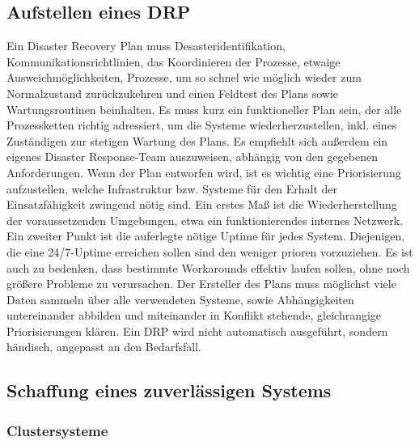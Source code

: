 \documentclass[letterpaper, 12pt]{article}
\let\tempsubsection\subsection
\renewcommand\subsection[1]{\vspace{0cm}\tempsubsection{#1}\vspace{0cm}}
\let\tempsubsubsection\subsubsection
\renewcommand\subsubsection[1]{\vspace{0cm}\tempsubsubsection{#1}\vspace{0cm}}
\begin{document}
\subsection{Aufstellen eines DRP \cite{booktwo}}

Ein Disaster Recovery Plan muss Desasteridentifikation, Kommunikationsrichtlinien, 
das Koordinieren der Prozesse, etwaige Ausweichmöglichkeiten, Prozesse, um so schnel wie möglich wieder 
zum Normalzustand zurückzukehren und einen Feldtest des Plans sowie Wartungsroutinen beinhalten. 
Es muss kurz ein funktioneller Plan sein, der alle Prozessketten richtig adressiert, um die 
Systeme wiederherzustellen, inkl. eines Zuständigen zur stetigen Wartung des Plans.
Es empfiehlt sich außerdem ein eigenes Disaster Response-Team auszuweisen, abhängig von den
gegebenen Anforderungen. Wenn der Plan entworfen wird, ist es wichtig eine Priorisierung aufzustellen,
welche Infrastruktur bzw. Systeme für den Erhalt der Einsatzfähigkeit zwingend nötig sind. Ein erstes Maß
ist die Wiederherstellung der voraussetzenden Umgebungen, etwa ein funktionierendes internes Netzwerk. Ein 
zweiter Punkt ist die auferlegte nötige Uptime für jedes System. Diejenigen, die eine 24/7-Uptime erreichen sollen
sind den weniger prioren vorzuziehen.
Es ist auch zu bedenken, dass bestimmte Workarounds effektiv laufen sollen, ohne noch größere Probleme
zu verursachen. Der Ersteller des Plans muss möglichst viele Daten sammeln über alle verwendeten Systeme,
sowie Abhängigkeiten untereinander abbilden und miteinander in Konflikt stehende, gleichrangige Priorisierungen klären. Ein DRP wird nicht automatisch ausgeführt, sondern händisch, angepasst an den Bedarfsfall.  \\

\subsection{Schaffung eines zuverlässigen Systems \cite{bookthree}}

\subsubsection{Clustersysteme}
\end{document}
